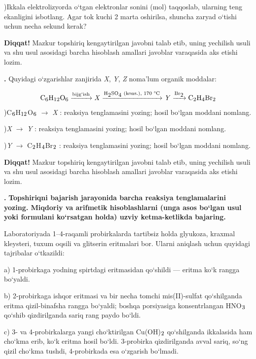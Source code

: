 \documentclass[11pt,a4paper]{article}
\renewcommand{\textsubscript}[1]{\ensuremath{_{\text{\fontsize{8}{8}\selectfont #1}}}}
\newcommand{\qn}[1]{\textbf{\fontsize{11.5}{13}\selectfont #1}}
\newcommand{\qsep}{\par\vspace{1pt}\noindent\rule{0pt}{0.4pt}\par\vspace{5pt}}
\newcommand{\diqqat}[1]{\par\smallskip\noindent\textbf{Diqqat!} #1\par\medskip}
\begin{document}
)Ikkala elektrolizyorda o`tgan elektronlar sonini (mol) taqqoslab, ularning teng ekanligini isbotlang. Agar tok kuchi 2 marta oshirilsa, shuncha zaryad o`tishi uchun necha sekund kerak?\par
\diqqat{Mazkur topshiriq kengaytirilgan javobni talab etib, uning yechilish usuli va shu usul asosidagi barcha hisoblash amallari javoblar varaqasida aks etishi lozim.}\qsep
\noindent\qn{42.} Quyidagi o`zgarishlar zanjirida \textit{X}, \textit{Y}, \textit{Z} noma'lum organik moddalar:\par
\[\setlength{\fboxsep}{0pt}\text{C\textsubscript{6}H\textsubscript{12}O\textsubscript{6}}\xrightarrow{\text{bijg`ish}}\text{\textit{X}}\xrightarrow{\text{H\textsubscript{2}SO\textsubscript{4} (kons.), 170 \textdegree{}C}}\text{\textit{Y}}\xrightarrow{\text{Br\textsubscript{2}}}\text{C\textsubscript{2}H\textsubscript{4}Br\textsubscript{2}}\]
)C\textsubscript{6}H\textsubscript{12}O\textsubscript{6} $\to$ \textit{X} : reaksiya tenglamasini yozing; hosil bo`lgan moddani nomlang.\par
{})\textit{X} $\to$ \textit{Y} : reaksiya tenglamasini yozing; hosil bo`lgan moddani nomlang.\par
{})\textit{Y} $\to$ C\textsubscript{2}H\textsubscript{4}Br\textsubscript{2} : reaksiya tenglamasini yozing; hosil bo`lgan moddani nomlang.\par
\diqqat{Mazkur topshiriq kengaytirilgan javobni talab etib, uning yechilish usuli va shu usul asosidagi barcha hisoblash amallari javoblar varaqasida aks etishi lozim.}\qsep
\noindent\qn{43.} \textbf{Topshiriqni bajarish jarayonida barcha reaksiya tenglamalarini yozing. Miqdoriy va arifmetik hisoblashlarni (unga asos bo`lgan usul yoki formulani ko`rsatgan holda) uzviy ketma-ketlikda bajaring.}\par\smallskip
Laboratoriyada 1--4-raqamli probirkalarda tartibsiz holda glyukoza, kraxmal kleysteri, tuxum oqsili va glitserin eritmalari bor. Ularni aniqlash uchun quyidagi tajribalar o`tkazildi:\par
a) 1-probirkaga yodning spirtdagi eritmasidan qo`shildi --- eritma ko`k rangga bo`yaldi.\par
b) 2-probirkaga ishqor eritmasi va bir necha tomchi mis(II)-sulfat qo`shilganda eritma qizil-binafsha rangga bo`yaldi; boshqa porsiyasiga konsentrlangan HNO\textsubscript{3} qo`shib qizdirilganda sariq rang paydo bo`ldi.\par
c) 3- va 4-probirkalarga yangi cho`ktirilgan Cu(OH)\textsubscript{2} qo`shilganda ikkalasida ham cho`kma erib, ko`k eritma hosil bo`ldi. 3-probirka qizdirilganda avval sariq, so`ng qizil cho`kma tushdi, 4-probirkada esa o`zgarish bo`lmadi.\par
\end{document}
